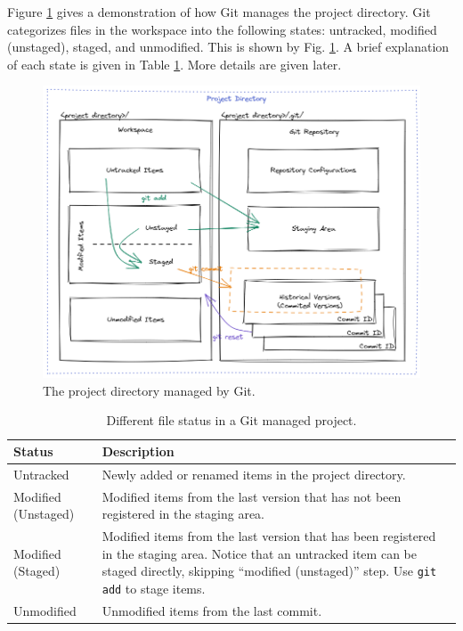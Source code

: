 Figure \ref{ch:sma:fig:gitbasics} gives a demonstration of how Git manages the project directory. Git categorizes files in the workspace into the following states: untracked, modified (unstaged), staged, and unmodified. This is shown by Fig. \ref{ch:sma:fig:gitbasics}. A brief explanation of each state is given in Table \ref{ch:sma:tab:gitbasics}. More details are given later.

\begin{figure}[!htb]
	\centering
	\includegraphics[width=350pt]{chapters/part-3/figures/gitbasics.png}
	\caption{The project directory managed by Git.} \label{ch:sma:fig:gitbasics}
\end{figure}

\begin{table}[!htb]
	\centering \caption{Different file status in a Git managed project.}\label{ch:sma:tab:gitbasics}
	\begin{tabularx}{\textwidth}{lX}
		\hline
		Status & Description \\ \hline
		Untracked & Newly added or renamed items in the project directory.  \\ 
		Modified (Unstaged) & Modified items from the last version that has not been registered in the staging area.  \\ 
		Modified (Staged) & Modified items from the last version that has been registered in the staging area. Notice that an untracked item can be staged directly, skipping ``modified (unstaged)'' step. Use \verb|git add| to stage items. \\ 
		Unmodified & Unmodified items from the last commit. \\ \hline
	\end{tabularx}
\end{table}

